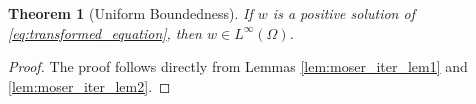 \documentclass[11pt]{article}
\newtheorem{theorem}{Theorem}[section] %
\newcommand{\om} {\Omega}
\begin{document}
\begin{theorem}[Uniform Boundedness] \label{thm:uniform_boundedness}
If \( w \) is a positive solution of \eqref{eq:transformed_equation}, then $w \in L^\infty(\om)$.
\end{theorem}
\begin{proof}
The proof follows directly from Lemmas \ref{lem:moser_iter_lem1} and \ref{lem:moser_iter_lem2}.
\end{proof}

\end{document}
